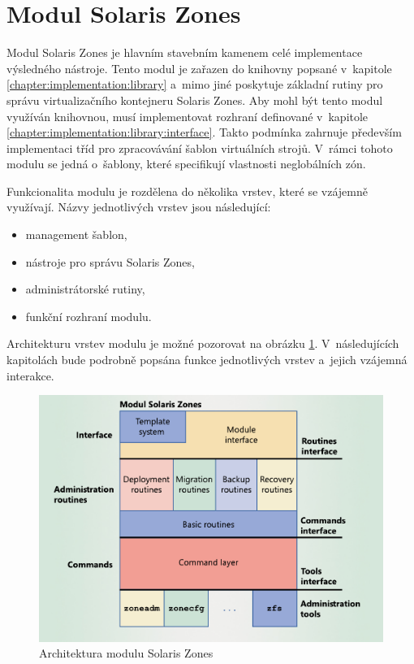 \section{Modul Solaris Zones}
\label{chapter:implementation:szones}
Modul Solaris Zones je hlavním stavebním kamenem celé implementace výsledného nástroje. Tento modul je zařazen do knihovny
popsané v~kapitole \ref{chapter:implementation:library} a~mimo jiné poskytuje základní rutiny pro správu virtualizačního
kontejneru Solaris Zones. Aby mohl být tento modul využíván knihovnou, musí implementovat rozhraní definované v~kapitole \ref{chapter:implementation:library:interface}.
Takto podmínka zahrnuje především implementaci tříd pro zpracovávání šablon virtuálních strojů. V~rámci tohoto modulu
se jedná o~šablony, které specifikují vlastnosti neglobálních zón. 

Funkcionalita modulu je rozdělena do několika vrstev, které se vzájemně využívají. Názvy jednotlivých vrstev jsou následující:
\begin{itemize}
 \item management šablon,
 \item nástroje pro správu Solaris Zones,
 \item administrátorské rutiny,
 \item funkční rozhraní modulu.
\end{itemize}
Architekturu vrstev modulu je možné pozorovat na obrázku \ref{image:implemetation:szones}. V~následujících kapitolách
bude podrobně popsána funkce jednotlivých vrstev a~jejich vzájemná interakce.
\begin{figure}[ht]
    \centering
    \includegraphics[scale=0.7]{assets/pdfs/module.pdf}
    \caption{Architektura modulu Solaris Zones}
    \label{image:implemetation:szones}
\end{figure}
